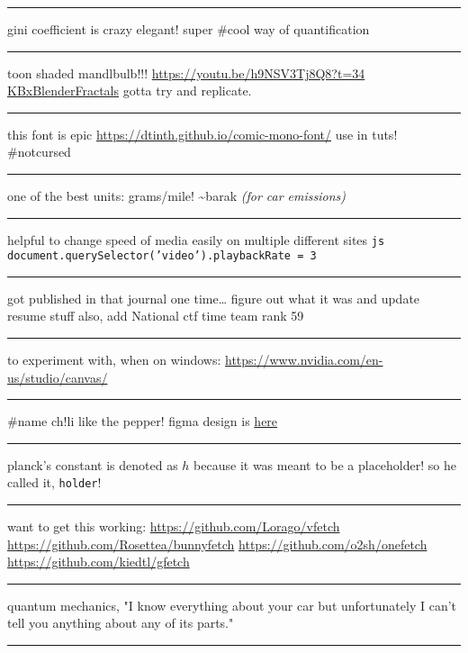 \documentclass[letterpaper]{article}
\begin{document}
\noindent\rule{\textwidth}{0.5pt}

gini coefficient is crazy elegant! super \#cool way of quantification

\noindent\rule{\textwidth}{0.5pt}

toon shaded mandlbulb!!! \url{https://youtu.be/h9NSV3Tj8Q8?t=34}
\href{KBxBlenderFractals.org}{KBxBlenderFractals} gotta try and
replicate.

\noindent\rule{\textwidth}{0.5pt}

this font is epic \url{https://dtinth.github.io/comic-mono-font/} use in tuts!
\#notcursed

\noindent\rule{\textwidth}{0.5pt}

one of the best units: grams/mile! \textasciitilde{}barak \emph{(for car emissions)}

\noindent\rule{\textwidth}{0.5pt}

helpful to change speed of media easily on multiple different sites
\texttt{js document.querySelector('video').playbackRate = 3}

\noindent\rule{\textwidth}{0.5pt}

got published in that journal one time\ldots{} figure out what it was and
update resume stuff also, add National ctf time team rank 59

\noindent\rule{\textwidth}{0.5pt}

to experiment with, when on windows:
\url{https://www.nvidia.com/en-us/studio/canvas/}

\noindent\rule{\textwidth}{0.5pt}

\#name ch!li like the pepper! figma design is
\href{https://www.figma.com/file/Z3qcCiUBVYOY8MZwlc6yS1/ch!li?node-id=0\%3A1}{here}

\noindent\rule{\textwidth}{0.5pt}

planck's constant is denoted as \(h\) because it was meant to be a
placeholder! so he called it, \texttt{holder}!

\noindent\rule{\textwidth}{0.5pt}

want to get this working: \url{https://github.com/Lorago/vfetch}
\url{https://github.com/Rosettea/bunnyfetch} \url{https://github.com/o2sh/onefetch}
\url{https://github.com/kiedtl/gfetch}

\noindent\rule{\textwidth}{0.5pt}

quantum mechanics, "I know everything about your car but unfortunately I
can't tell you anything about any of its parts."

\noindent\rule{\textwidth}{0.5pt}
\end{document}
